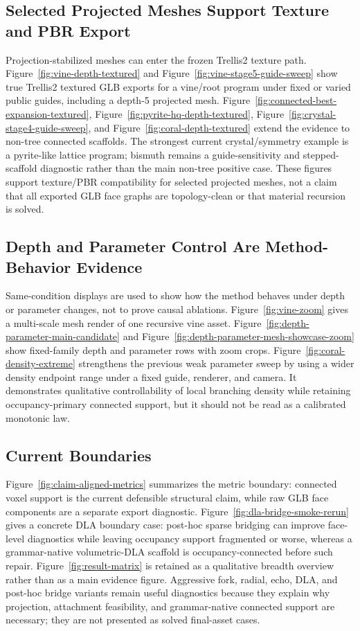 \documentclass[sigconf,anonymous,review]{acmart}
\begin{document}
\subsection{Selected Projected Meshes Support Texture and PBR Export}
Projection-stabilized meshes can enter the frozen Trellis2 texture path. Figure~\ref{fig:vine-depth-textured} and Figure~\ref{fig:vine-stage5-guide-sweep} show true Trellis2 textured GLB exports for a vine/root program under fixed or varied public guides, including a depth-5 projected mesh. Figure~\ref{fig:connected-best-expansion-textured}, Figure~\ref{fig:pyrite-hq-depth-textured}, Figure~\ref{fig:crystal-stage4-guide-sweep}, and Figure~\ref{fig:coral-depth-textured} extend the evidence to non-tree connected scaffolds. The strongest current crystal/symmetry example is a pyrite-like lattice program; bismuth remains a guide-sensitivity and stepped-scaffold diagnostic rather than the main non-tree positive case. These figures support texture/PBR compatibility for selected projected meshes, not a claim that all exported GLB face graphs are topology-clean or that material recursion is solved.

\subsection{Depth and Parameter Control Are Method-Behavior Evidence}
Same-condition displays are used to show how the method behaves under depth or parameter changes, not to prove causal ablations. Figure~\ref{fig:vine-zoom} gives a multi-scale mesh render of one recursive vine asset. Figure~\ref{fig:depth-parameter-main-candidate} and Figure~\ref{fig:depth-parameter-mesh-showcase-zoom} show fixed-family depth and parameter rows with zoom crops. Figure~\ref{fig:coral-density-extreme} strengthens the previous weak parameter sweep by using a wider density endpoint range under a fixed guide, renderer, and camera. It demonstrates qualitative controllability of local branching density while retaining occupancy-primary connected support, but it should not be read as a calibrated monotonic law.

\subsection{Current Boundaries}
Figure~\ref{fig:claim-aligned-metrics} summarizes the metric boundary: connected voxel support is the current defensible structural claim, while raw GLB face components are a separate export diagnostic. Figure~\ref{fig:dla-bridge-smoke-rerun} gives a concrete DLA boundary case: post-hoc sparse bridging can improve face-level diagnostics while leaving occupancy support fragmented or worse, whereas a grammar-native volumetric-DLA scaffold is occupancy-connected before such repair. Figure~\ref{fig:result-matrix} is retained as a qualitative breadth overview rather than as a main evidence figure. Aggressive fork, radial, echo, DLA, and post-hoc bridge variants remain useful diagnostics because they explain why projection, attachment feasibility, and grammar-native connected support are necessary; they are not presented as solved final-asset cases.
\end{document}
